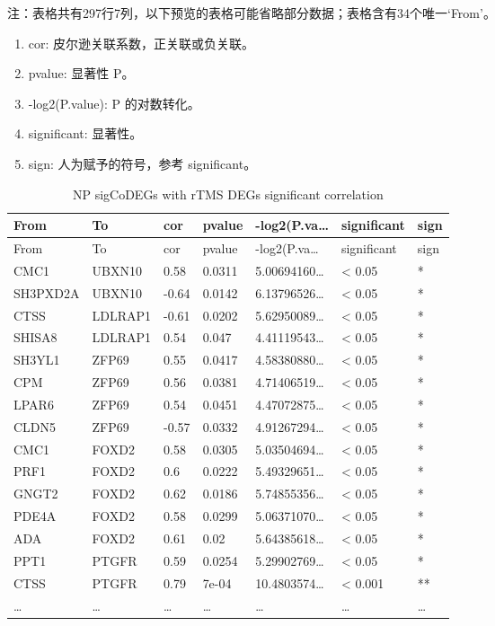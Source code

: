 \documentclass[
]{article}
\providecommand{\tightlist}{%
  \setlength{\itemsep}{0pt}\setlength{\parskip}{0pt}}
\begin{document}
\begin{center}\begin{tcolorbox}[colback=gray!10, colframe=gray!50, width=0.9\linewidth, arc=1mm, boxrule=0.5pt]注：表格共有297行7列，以下预览的表格可能省略部分数据；表格含有34个唯一`From'。
\end{tcolorbox}
\end{center}
\begin{center}\begin{tcolorbox}[colback=gray!10, colframe=gray!50, width=0.9\linewidth, arc=1mm, boxrule=0.5pt]\begin{enumerate}\tightlist
\item cor: 皮尔逊关联系数，正关联或负关联。
\item pvalue: 显著性 P。
\item -log2(P.value): P 的对数转化。
\item significant: 显著性。
\item sign: 人为赋予的符号，参考 significant。
\end{enumerate}\end{tcolorbox}
\end{center}

\begin{longtable}[]{@{}lllllll@{}}
\caption{\label{tab:NP-sigCoDEGs-with-rTMS-DEGs-significant-correlation}NP sigCoDEGs with rTMS DEGs significant correlation}\tabularnewline
\toprule
From & To & cor & pvalue & -log2(P.va\ldots{} & significant & sign\tabularnewline
\midrule
\endfirsthead
\toprule
From & To & cor & pvalue & -log2(P.va\ldots{} & significant & sign\tabularnewline
\midrule
\endhead
CMC1 & UBXN10 & 0.58 & 0.0311 & 5.00694160\ldots{} & \textless{} 0.05 & *\tabularnewline
SH3PXD2A & UBXN10 & -0.64 & 0.0142 & 6.13796526\ldots{} & \textless{} 0.05 & *\tabularnewline
CTSS & LDLRAP1 & -0.61 & 0.0202 & 5.62950089\ldots{} & \textless{} 0.05 & *\tabularnewline
SHISA8 & LDLRAP1 & 0.54 & 0.047 & 4.41119543\ldots{} & \textless{} 0.05 & *\tabularnewline
SH3YL1 & ZFP69 & 0.55 & 0.0417 & 4.58380880\ldots{} & \textless{} 0.05 & *\tabularnewline
CPM & ZFP69 & 0.56 & 0.0381 & 4.71406519\ldots{} & \textless{} 0.05 & *\tabularnewline
LPAR6 & ZFP69 & 0.54 & 0.0451 & 4.47072875\ldots{} & \textless{} 0.05 & *\tabularnewline
CLDN5 & ZFP69 & -0.57 & 0.0332 & 4.91267294\ldots{} & \textless{} 0.05 & *\tabularnewline
CMC1 & FOXD2 & 0.58 & 0.0305 & 5.03504694\ldots{} & \textless{} 0.05 & *\tabularnewline
PRF1 & FOXD2 & 0.6 & 0.0222 & 5.49329651\ldots{} & \textless{} 0.05 & *\tabularnewline
GNGT2 & FOXD2 & 0.62 & 0.0186 & 5.74855356\ldots{} & \textless{} 0.05 & *\tabularnewline
PDE4A & FOXD2 & 0.58 & 0.0299 & 5.06371070\ldots{} & \textless{} 0.05 & *\tabularnewline
ADA & FOXD2 & 0.61 & 0.02 & 5.64385618\ldots{} & \textless{} 0.05 & *\tabularnewline
PPT1 & PTGFR & 0.59 & 0.0254 & 5.29902769\ldots{} & \textless{} 0.05 & *\tabularnewline
CTSS & PTGFR & 0.79 & 7e-04 & 10.4803574\ldots{} & \textless{} 0.001 & **\tabularnewline
\ldots{} & \ldots{} & \ldots{} & \ldots{} & \ldots{} & \ldots{} & \ldots{}\tabularnewline
\bottomrule
\end{longtable}
\end{document}
